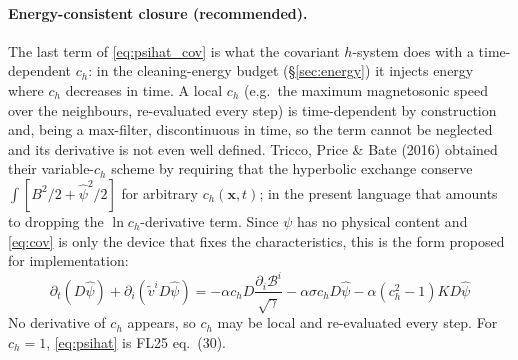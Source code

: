 \documentclass[11pt,a4paper]{article}
\newcommand{\cB}{\mathcal{B}}
\newcommand{\ph}{\hat\psi}
\newcommand{\ch}{c_h}
\newcommand{\pd}{\partial}
\newcommand{\sg}{\sqrt{\gamma}}
\begin{document}
\paragraph{Energy-consistent closure (recommended).} The last term of \eqref{eq:psihat_cov} is what the covariant $h$-system does with a time-dependent $\ch$: in the cleaning-energy budget (\S\ref{sec:energy}) it injects energy where $\ch$ decreases in time. A local $\ch$ (e.g.\ the maximum magnetosonic speed over the neighbours, re-evaluated every step) is time-dependent by construction and, being a max-filter, discontinuous in time, so the term cannot be neglected and its derivative is not even well defined. Tricco, Price \& Bate (2016) obtained their variable-$\ch$ scheme by requiring that the hyperbolic exchange conserve $\int[B^2/2+\ph^2/2]$ for arbitrary $\ch(\bm x,t)$; in the present language that amounts to dropping the $\ln\ch$-derivative term. Since $\psi$ has no physical content and \eqref{eq:cov} is only the device that fixes the characteristics, this is the form proposed for implementation:
\begin{equation}
\boxed{\;
\pd_t(D\ph)+\pd_i\!\left(\tilde v^iD\ph\right)
=-\alpha\ch D\frac{\pd_i\cB^i}{\sg}-\alpha\sigma\ch D\ph-\alpha\left(\ch^2-1\right)K D\ph\;}
\label{eq:psihat}
\end{equation}
No derivative of $\ch$ appears, so $\ch$ may be local and re-evaluated every step. For $\ch=1$, \eqref{eq:psihat} is FL25 eq.~(30).
\end{document}
